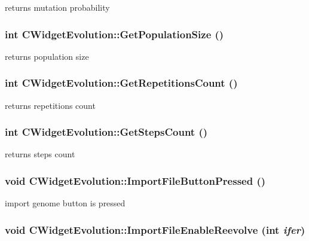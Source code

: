 \label{classCWidgetEvolution_a5880bb761b37c1cdf3e9bed2def2a88b}
returns mutation probability \hypertarget{classCWidgetEvolution_a73c50aad4c50e16931ffe9e82e8c1ddd}{
\subsubsection[{GetPopulationSize}]{\setlength{\rightskip}{0pt plus 5cm}int CWidgetEvolution::GetPopulationSize ()}}
\label{classCWidgetEvolution_a73c50aad4c50e16931ffe9e82e8c1ddd}
returns population size \hypertarget{classCWidgetEvolution_ab932d951a5043baf812f8d8b7ba09681}{
\subsubsection[{GetRepetitionsCount}]{\setlength{\rightskip}{0pt plus 5cm}int CWidgetEvolution::GetRepetitionsCount ()}}
\label{classCWidgetEvolution_ab932d951a5043baf812f8d8b7ba09681}
returns repetitions count \hypertarget{classCWidgetEvolution_a311003fd6ff969e460b56c994e3ba3f5}{
\subsubsection[{GetStepsCount}]{\setlength{\rightskip}{0pt plus 5cm}int CWidgetEvolution::GetStepsCount ()}}
\label{classCWidgetEvolution_a311003fd6ff969e460b56c994e3ba3f5}
returns steps count \hypertarget{classCWidgetEvolution_a2c27b79baf649227eac32b819874eac2}{
\subsubsection[{ImportFileButtonPressed}]{\setlength{\rightskip}{0pt plus 5cm}void CWidgetEvolution::ImportFileButtonPressed ()}}
\label{classCWidgetEvolution_a2c27b79baf649227eac32b819874eac2}
import genome button is pressed \hypertarget{classCWidgetEvolution_a85d018ad28c22f7b20ecefa82b282313}{
\subsubsection[{ImportFileEnableReevolve}]{\setlength{\rightskip}{0pt plus 5cm}void CWidgetEvolution::ImportFileEnableReevolve (int {\em ifer})}}
